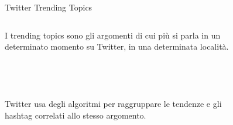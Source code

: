 \documentclass[xcolor=svgnames, aspectratio=169]{beamer}
\begin{document}
\begin{frame}{Twitter Trending Topics}
    \fontsize{10pt}{10}\selectfont
    \begin{columns}[t]
        I trending topics sono gli argomenti di cui più si parla in un determinato momento su Twitter, in una determinata località.\\~\\~\\~\\~\\
        
        Twitter usa degli algoritmi per raggruppare le tendenze e gli hashtag correlati allo stesso argomento.
        \vspace*{-48pt}
        \begin{figure}[H]
            \centering
            \noindent{}
        \end{figure}
    \end{columns}
\end{frame}
\end{document}
